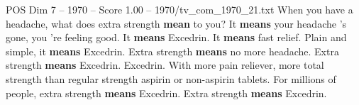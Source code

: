 \begin{textsample}{POS Dim 7 – 1970 – Score 1.00 – 1970/tv\_com\_1970\_21.txt}  \label{ex:f7_pos_038}
When you have a headache, what does extra strength \textbf{mean} to you?
It \textbf{means} your headache 's gone, you 're feeling good.
It \textbf{means} Excedrin.
It \textbf{means} fast relief.
Plain and simple, it \textbf{means} Excedrin.
Extra strength \textbf{means} no more headache.
Extra strength \textbf{means} Excedrin.
Excedrin.
With more pain reliever, more total strength than regular strength aspirin or non-aspirin tablets.
For millions of people, extra strength \textbf{means} Excedrin.
Extra strength \textbf{means} Excedrin.

\end{textsample}
